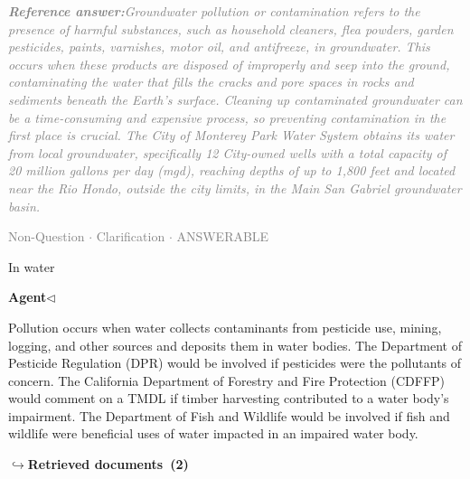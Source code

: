 \documentclass[a4paper,11pt]{article}
\begin{document}
\begin{refanswerenv}
{\footnotesize\textit{\textcolor{gray}{\textbf{Reference answer:}\enspace Groundwater pollution or contamination refers to the presence of harmful substances, such as household cleaners, flea powders, garden pesticides, paints, varnishes, motor oil, and antifreeze, in groundwater. This occurs when these products are disposed of improperly and seep into the ground, contaminating the water that fills the cracks and pore spaces in rocks and sediments beneath the Earth's surface. Cleaning up contaminated groundwater can be a time-consuming and expensive process, so preventing contamination in the first place is crucial. The City of Monterey Park Water System obtains its water from local groundwater, specifically 12 City-owned wells with a total capacity of 20 million gallons per day (mgd), reaching depths of up to 1,800 feet and located near the Rio Hondo, outside the city limits, in the Main San Gabriel groundwater basin.}}}
\end{refanswerenv}
\vspace{0.5em}
\hfill{\tiny\textcolor{gray}{Non-Question $\cdot$ Clarification $\cdot$ ANSWERABLE}}
\begin{userbubble}
In water
\end{userbubble}
\noindent\hfill{\small\textcolor{agentcolor}{\textbf{Agent\enspace$\triangleleft$}}}
\begin{agentbubble}
Pollution occurs when water collects contaminants from pesticide use, mining, logging, and other sources and deposits them in water bodies. The Department of Pesticide Regulation (DPR) would be involved if pesticides were the pollutants of concern. The California Department of Forestry and Fire Protection (CDFFP) would comment on a TMDL if timber harvesting contributed to a water body's impairment. The Department of Fish and Wildlife would be involved if fish and wildlife were beneficial uses of water impacted in an impaired water body.
\end{agentbubble}
\noindent\hfill{\footnotesize\textcolor{doccolor}{\textbf{$\hookrightarrow$\enspace Retrieved documents~(2)}}}
\end{document}
